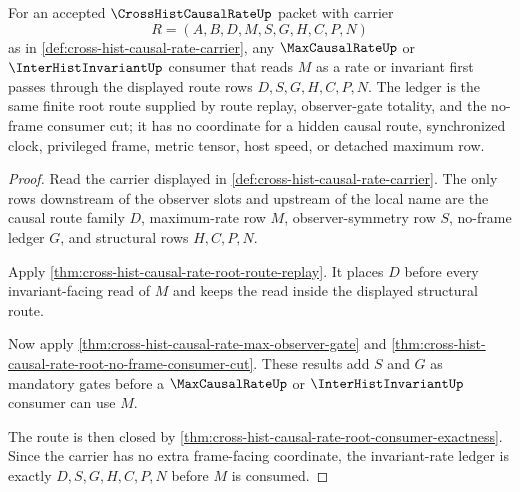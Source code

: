 \begin{theorem}
\label{thm:cross-hist-causal-rate-invariant-rate-ledger}
For an accepted $\CrossHistCausalRateUp$ packet with carrier
$$
R=(A,B,D,M,S,G,H,C,P,N)
$$
as in \autoref{def:cross-hist-causal-rate-carrier}, any $\MaxCausalRateUp$ or $\InterHistInvariantUp$ consumer that reads $M$ as a rate or invariant first passes through the displayed route rows $D,S,G,H,C,P,N$. The ledger is the same finite root route supplied by route replay, observer-gate totality, and the no-frame consumer cut; it has no coordinate for a hidden causal route, synchronized clock, privileged frame, metric tensor, host speed, or detached maximum row.
\end{theorem}
\begin{proof}
Read the carrier displayed in \autoref{def:cross-hist-causal-rate-carrier}. The only rows downstream of the observer slots and upstream of the local name are the causal route family $D$, maximum-rate row $M$, observer-symmetry row $S$, no-frame ledger $G$, and structural rows $H,C,P,N$.

Apply \autoref{thm:cross-hist-causal-rate-root-route-replay}. It places $D$ before every invariant-facing read of $M$ and keeps the read inside the displayed structural route.

Now apply \autoref{thm:cross-hist-causal-rate-max-observer-gate} and \autoref{thm:cross-hist-causal-rate-root-no-frame-consumer-cut}. These results add $S$ and $G$ as mandatory gates before a $\MaxCausalRateUp$ or $\InterHistInvariantUp$ consumer can use $M$.

The route is then closed by \autoref{thm:cross-hist-causal-rate-root-consumer-exactness}. Since the carrier has no extra frame-facing coordinate, the invariant-rate ledger is exactly $D,S,G,H,C,P,N$ before $M$ is consumed.
\end{proof}


